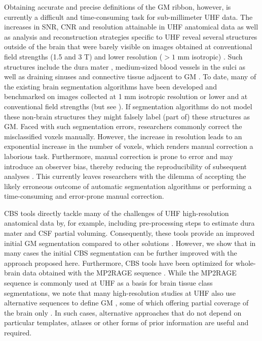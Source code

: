 Obtaining accurate and precise definitions of the GM ribbon, however, is currently a difficult and time-consuming task for sub-millimeter UHF data. The increases in SNR, CNR and resolution attainable in UHF anatomical data as well as analysis \parencite{Moortele2009} and reconstruction \parencite{Marques2010} strategies specific to UHF reveal several structures outside of the brain that were barely visible on images obtained at conventional field strengths (1.5 and 3 T) and lower resolution ($> 1$ mm isotropic) \parencite{Viviani2017}. Such structures include the dura mater \parencite{VanderKouwe2008}, medium-sized blood vessels in the sulci \parencite{Viviani2016} as well as draining sinuses and connective tissue adjacent to GM \parencite{Helms2006}. To date, many of the existing brain segmentation algorithms have been developed and benchmarked on images collected at 1 mm isotropic resolution or lower and at conventional field strengths \parencite{Helms2016} (but see \cite{Bazin2014}). If segmentation algorithms do not model these non-brain structures they might falsely label (part of) these structures as GM. Faced with such segmentation errors, researchers commonly correct the misclassified voxels manually. However, the increase in resolution leads to an exponential increase in the number of voxels, which renders manual correction a laborious task. Furthermore, manual correction is prone to error and may introduce an observer bias, thereby reducing the reproducibility of subsequent analyses \parencite{Despotovic2015}. This currently leaves researchers with the dilemma of accepting the likely erroneous outcome of automatic segmentation algorithms or performing a time-consuming and error-prone manual correction.

CBS tools \parencite{Bazin2014} directly tackle many of the challenges of UHF high-resolution anatomical data by, for example, including pre-processing steps to estimate dura mater and CSF partial voluming. Consequently, these tools provide an improved initial GM segmentation compared to other solutions \parencite{Bazin2014}. However, we show that in many cases the initial CBS segmentation can be further improved with the approach proposed here. Furthermore, CBS tools have been optimized for whole-brain data obtained with the MP2RAGE sequence \parencite{Marques2010}. While the MP2RAGE sequence is commonly used at UHF as a basis for brain tissue class segmentations, we note that many high-resolution studies at UHF also use alternative sequences to define GM \parencite{Huber2015, Renvall2016, Kashyap2017,Moortele2009}, some of which offering partial coverage of the brain only \parencite{Huber2015, Kashyap2017}. In such cases, alternative approaches that do not depend on particular templates, atlases or other forms of prior information are useful and required.

